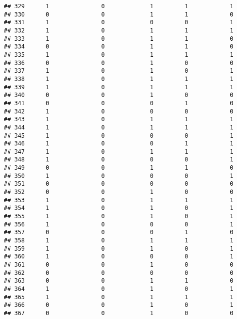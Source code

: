 \documentclass[]{article}
\begin{document}
\begin{verbatim}
## 329      1               0             1         1            1
## 330      0               0             1         1            0
## 331      1               0             0         0            1
## 332      1               0             1         1            1
## 333      1               0             1         1            0
## 334      0               0             1         1            0
## 335      1               0             1         1            1
## 336      0               0             1         0            0
## 337      1               0             1         0            1
## 338      1               0             1         1            1
## 339      1               0             1         1            1
## 340      0               0             1         0            0
## 341      0               0             0         1            0
## 342      1               0             0         0            0
## 343      1               0             1         1            1
## 344      1               0             1         1            1
## 345      1               0             0         0            1
## 346      1               0             0         1            1
## 347      1               0             1         1            1
## 348      1               0             0         0            1
## 349      0               0             1         1            0
## 350      1               0             0         0            1
## 351      0               0             0         0            0
## 352      0               0             1         0            0
## 353      1               0             1         1            1
## 354      1               0             1         0            1
## 355      1               0             1         0            1
## 356      1               0             0         0            1
## 357      0               0             0         1            0
## 358      1               0             1         1            1
## 359      1               0             1         0            1
## 360      1               0             0         0            1
## 361      0               0             1         0            0
## 362      0               0             0         0            0
## 363      0               0             1         1            0
## 364      1               0             1         0            1
## 365      1               0             1         1            1
## 366      0               0             1         0            1
## 367      0               0             1         0            0

\end{verbatim}
\end{document}
